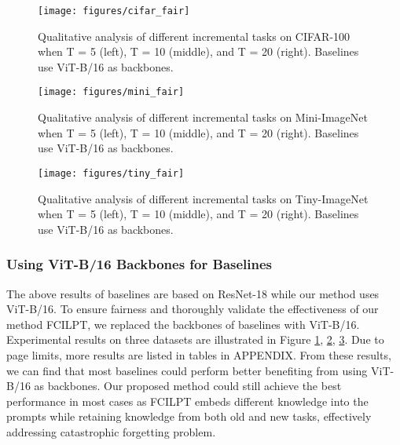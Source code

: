 \documentclass[sigconf,anonymous,review,screen]{acmart}
\begin{document}






\begin{figure}
	\centering
	\texttt{[image: figures/cifar\_fair]}
	\caption{Qualitative analysis of different incremental tasks on CIFAR-100 when T = 5 (left), T = 10 (middle), and T = 20 (right).  Baselines use ViT-B/16 as backbones.}
	\label{fig_4}
\end{figure}

\begin{figure}
	\centering
	\texttt{[image: figures/mini\_fair]}
	\caption{Qualitative analysis of different incremental tasks on Mini-ImageNet when T = 5 (left), T = 10 (middle), and T = 20 (right). Baselines use ViT-B/16 as backbones.}
	\label{fig_5}
\end{figure}

\begin{figure}
	\centering
	\texttt{[image: figures/tiny\_fair]}
	\caption{Qualitative analysis of different incremental tasks on Tiny-ImageNet when T = 5 (left), T = 10 (middle), and T = 20 (right). Baselines use ViT-B/16 as backbones.}
	\label{fig_6}
\end{figure}


\subsubsection{Using ViT-B/16 Backbones for Baselines} \label{Further Fair Experiments}
The above results of baselines are based on ResNet-18 while our method uses ViT-B/16. To ensure fairness and thoroughly validate the effectiveness of our method FCILPT, we replaced the backbones of baselines with ViT-B/16. Experimental results on three datasets are illustrated in Figure \ref{fig_4}, \ref{fig_5}, \ref{fig_6}. Due to page limits, more results are listed in tables in APPENDIX. From these results, we can find that most baselines could perform better benefiting from using  ViT-B/16 as backbones. Our proposed method could still achieve the best performance in most cases as FCILPT embeds different knowledge into the prompts while retaining knowledge from both old and new tasks, effectively addressing catastrophic forgetting problem.
\end{document}
